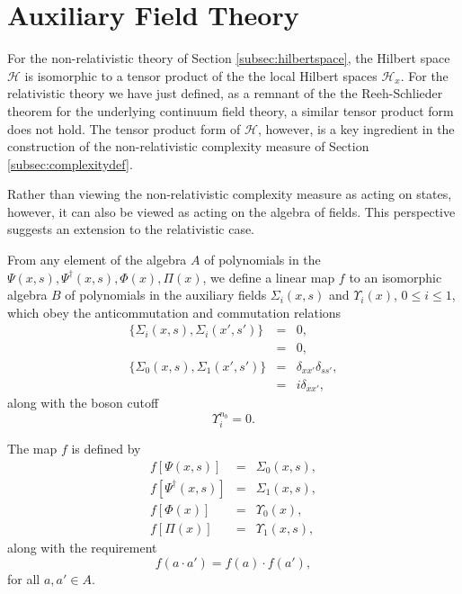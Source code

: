 \documentclass[12pt,amsmath,amssymb,onecolumn]{revtex4-2}
\begin{document}
\section{\label{subsec:auxiliarya} Auxiliary Field Theory}


For the
non-relativistic theory of Section \ref{subsec:hilbertspace},
the Hilbert space $\mathcal{H}$ is isomorphic to a tensor
product of the 
the local Hilbert spaces $\mathcal{H}_x$.
For the relativistic theory we have just defined,
as a remnant of the 
the Reeh-Schlieder theorem for the underlying continuum field theory,
a similar tensor product form does not hold.
The tensor product form of $\mathcal{H}$,
however, is a key ingredient in the construction of the non-relativistic
complexity measure
of Section \ref{subsec:complexitydef}.


Rather than viewing the
non-relativistic complexity measure as acting on
states, however, it can also be viewed as acting on the algebra of fields.
This perspective suggests an extension to
the relativistic case.

From any element of the algebra $A$ of polynomials in the $\Psi( x, s), \Psi^\dagger( x, s), \Phi(x), \Pi(x)$, 
we define a linear map
$f$ to an isomorphic algebra $B$ of 
polynomials in the auxiliary fields $\Sigma_i( x, s)$ and $\Upsilon_i( x)$, $0 \le i \le 1$,
which obey the anticommutation and commutation relations
\begin{subequations}
\begin{eqnarray}
\label{anticommute4}
\{ \Sigma_i( x, s), \Sigma_i( x', s') \} & = & 0, \\
\label{commute4}
[ \Upsilon_i( x), \Upsilon_i( x')] & = & 0, \\
\label{anticommute5}
\{\Sigma_0( x, s),\Sigma_1( x', s') \} &=&  \delta_{xx'} \delta_{ss'}, \\
\label{commute5}
[\Upsilon_0( x),\Upsilon_1( x') ] & = &  i \delta_{xx'},
\end{eqnarray}
\end{subequations}
along with the boson cutoff
\begin{equation}
    \label{cutoff2}
    \Upsilon_i^{n_b} = 0.
\end{equation}

The map $f$ is defined by
\begin{subequations}
\begin{eqnarray}
\label{mappsi}
f[ \Psi( x, s)] &=& \Sigma_0( x, s), \\
\label{mappsibar}
f[\Psi^\dagger( x, s)] & = &  \Sigma_1( x, s), \\
\label{mapphi}
f[ \Phi( x)] &=& \Upsilon_0( x), \\
\label{mapphidag}
f[\Pi( x)] & = &  \Upsilon_1( x, s),
\end{eqnarray}
\end{subequations}
along with the requirement
\begin{equation}
\label{preserveprod}
f( a \cdot a')  =  f( a) \cdot f(a'), 
\end{equation}
for all $a, a' \in A$.
\end{document}
